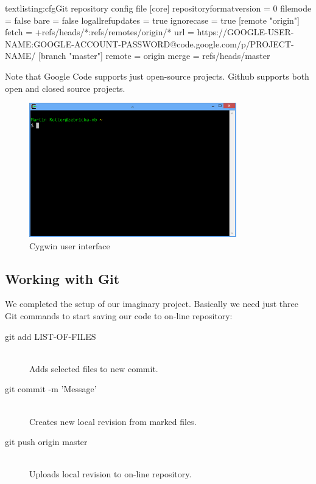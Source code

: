 \begin{fdoccode}{text}{listing:cfg}{Git repository config file}
[core]
	repositoryformatversion = 0
	filemode = false
	bare = false
	logallrefupdates = true
	ignorecase = true
[remote "origin"]
	fetch = +refs/heads/*:refs/remotes/origin/*
	url = https://GOOGLE-USER-NAME:GOOGLE-ACCOUNT-PASSWORD@code.google.com/p/PROJECT-NAME/
[branch "master"]
	remote = origin
	merge = refs/heads/master
\end{fdoccode}

\begin{fdocextra}
Note that Google Code supports just open-source projects. Github supports both open and closed source projects.
\end{fdocextra}

\begin{figure}[ht]
\begin{center}
\includegraphics[width=9cm]{graphics/real-world/04-cygwin.png}
\caption{Cygwin user interface}\label{figure:cig}
\end{center}
\end{figure}

\subsection{Working with Git}
We completed the setup of our imaginary project. Basically we need just three Git commands to start saving our code to on-line repository:
\begin{description}
\item[git add LIST-OF-FILES] \hfill \\
Adds selected files to new commit.
\item[git commit -m 'Message'] \hfill \\
Creates new local revision from marked files.
\item[git push origin master] \hfill \\
Uploads local revision to on-line repository.
\end{description}

